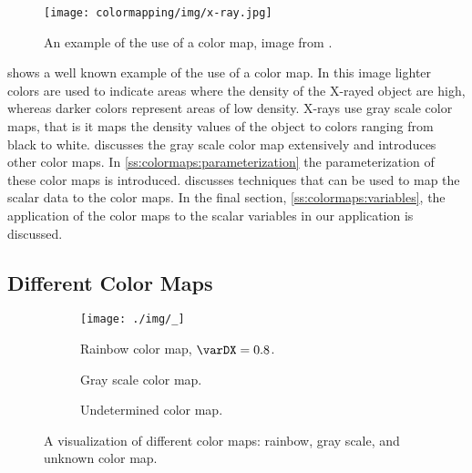 
\begin{figure}
	\centering
	\texttt{[image: colormapping/img/x-ray.jpg]}
	\caption{An example of the use of a color map, image from \cite{xray}.}
	\label{fig:colormapping:xray}
\end{figure}

 shows a well known example of the use of a color map. In this image lighter colors are used to indicate areas where the density of the X-rayed object are high, whereas darker colors represent areas of low density. X-rays use gray scale color maps, that is it maps the density values of the object to colors ranging from black to white.  discusses the gray scale color map extensively and introduces other color maps. In \cref{ss:colormaps:parameterization} the parameterization of these color maps is introduced.  discusses techniques that can be used to map the scalar data to the color maps. In the final section, \cref{ss:colormaps:variables}, the application of the color maps to the scalar variables in our application is discussed. 

\subsection{Different Color Maps}
\label{ss:colormaps:differentmaps}

\begin{figure}
	\centering
	\begin{subfigure}{\textwidth}
		\centering
		\texttt{[image: ./img/\_]}
		\caption{Rainbow color map, $\varDX = 0.8$.}
		\label{fig:colormapping:intro:differntColorMaps:rainbow}
	\end{subfigure}
	\begin{subfigure}{\textwidth}
		\centering
		\caption{Gray scale color map.}
		\label{fig:colormapping:intro:differntColorMaps:grayscale}
	\end{subfigure}	
	\begin{subfigure}{\textwidth}
		\centering
		\caption{Undetermined color map.}
		\label{fig:colormapping:intro:differntColorMaps:ofChoice}
	\end{subfigure}		
	\caption{A visualization of different color maps:  rainbow,  gray scale, and  unknown color map.}
	\label{fig:colormapping:introduction}
\end{figure}

